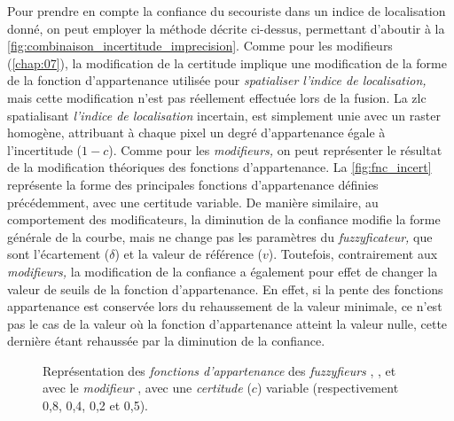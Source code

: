 Pour prendre en compte la confiance du secouriste dans un indice de
localisation donné, on peut employer la méthode décrite ci-dessus,
permettant d'aboutir à la
\autoref{fig:combinaison_incertitude_imprecision}. Comme pour les
modifieurs (\autoref{chap:07}), la modification de la certitude
implique une modification de la forme de la fonction d'appartenance
utilisée pour \emph{spatialiser l'indice de localisation,} mais cette
modification n'est pas réellement effectuée lors de la fusion. La
\ac{zlc} spatialisant \emph{l'indice de localisation} incertain, est
simplement unie avec un raster homogène, attribuant à chaque pixel un
degré d'appartenance égale à l'incertitude (\(1-c\)). Comme pour les
\emph{modifieurs,} on peut représenter le résultat de la modification
théoriques des fonctions d'appartenance. La \autoref{fig:fnc_incert}
représente la forme des principales fonctions d'appartenance définies
précédemment, avec une certitude variable. De manière similaire, au
comportement des modificateurs, la diminution de la confiance modifie
la forme générale de la courbe, mais ne change pas les paramètres du
\emph{fuzzyficateur,} que sont l'écartement (\(\delta\)) et la valeur
de référence (\(v\)). Toutefois, contrairement aux \emph{modifieurs,}
la modification de la confiance a également pour effet de changer la
valeur de seuils de la fonction d'appartenance. En effet, si la pente
des fonctions appartenance est conservée lors du rehaussement de la
valeur minimale, ce n'est pas le cas de la valeur où la fonction
d'appartenance atteint la valeur nulle, cette dernière étant rehaussée
par la diminution de la confiance.

\begin{figure}
  \centering  \subfloat[\label{fig:fnc_app_inc}]{}\hfill
  \subfloat[\label{fig:fnc_app_inc_2}]{}

  \subfloat[\label{fig:fnc_app_inc_3}]{}\hfill
  \subfloat[\label{fig:fnc_app_inc_4}]{}
  \caption[Représentation des \emph{fonctions d'appartenance} de
  différents \emph{fuzzyfieurs} avec une
  \emph{incertitude}]{Représentation des \emph{fonctions
      d'appartenance} des \emph{fuzzyfieurs}
    \protect{} \protect{},
    \protect{} \protect{},
    \protect{} \protect{}
    et \protect{} avec le \emph{modifieur}
    \protect{} \protect{}, avec
    une \emph{certitude} (\(c\)) variable (respectivement 0,8, 0,4,
    0,2 et 0,5).}
  \label{fig:fnc_incert}
\end{figure}

